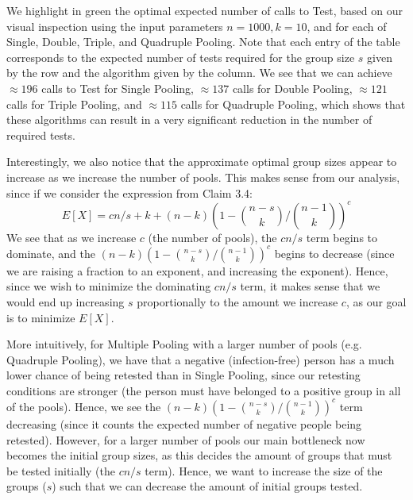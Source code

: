 \documentclass[12pt]{article}
\begin{document}
We highlight in green the optimal expected number of calls to {\sf Test}, based on our visual inspection using the input parameters $n=1000, k=10$, and for each of Single, Double, Triple, and Quadruple Pooling. Note that each entry of the table corresponds to the expected number of tests required for the group size $s$ given by the row and the algorithm given by the column. We see that we can achieve $\approx196$ calls to {\sf Test} for Single Pooling, $\approx137$ calls for Double Pooling, $\approx121$ calls for Triple Pooling, and $\approx115$ calls for Quadruple Pooling, which shows that these algorithms can result in a very significant reduction in the number of required tests.

Interestingly, we also notice that the approximate optimal group sizes appear to increase as we increase the number of pools. This makes sense from our analysis, since if we consider the expression from Claim 3.4:
$$E[X]= cn/s+k+(n-k){(1-{n-s \choose k}/{n-1 \choose k})^c} $$
We see that as we increase $c$ (the number of pools), the $cn/s$ term begins to dominate, and the $(n-k){(1-{n-s \choose k}/{n-1 \choose k})^c}$ begins to decrease (since we are raising a fraction to an exponent, and increasing the exponent). Hence, since we wish to minimize the dominating $cn/s$ term, it makes sense that we would end up increasing $s$ proportionally to the amount we increase $c$, as our goal is to minimize $E[X]$. 

More intuitively, for Multiple Pooling with a larger number of pools (e.g. Quadruple Pooling), we have that a negative (infection-free) person has a much lower chance of being retested than in Single Pooling, since our retesting conditions are stronger (the person must have belonged to a positive group in all of the pools). Hence, we see the $(n-k){(1-{n-s \choose k}/{n-1 \choose k})^c}$ term decreasing (since it counts the expected number of negative people being retested). However, for a larger number of pools our main bottleneck now becomes the initial group sizes, as this decides the amount of groups that must be tested initially (the $cn/s$ term). Hence, we want to increase the size of the groups ($s$) such that we can decrease the amount of initial groups tested.
\end{document}
